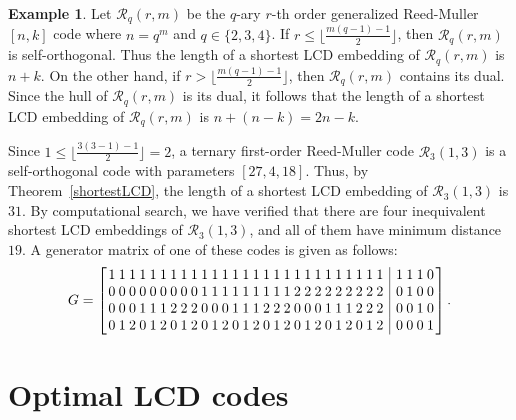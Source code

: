 \documentclass{article}
\theoremstyle{definition}
\newtheorem{example}[definition]{Example}
\theoremstyle{remark}
\begin{document}
\begin{example}
    Let $\mathcal{R}_q(r, m)$ be the $q$-ary $r$-th order generalized Reed-Muller $[n, k]$ code where $n=q^m$ and $q\in\{2, 3, 4\}$. If $r\le\lfloor\frac{m(q-1)-1}{2}\rfloor$, then $\mathcal{R}_q(r, m)$ is self-orthogonal. Thus the length of a shortest LCD embedding of $\mathcal{R}_q(r, m)$ is $n+k$. On the other hand, if $r>\lfloor\frac{m(q-1)-1}{2}\rfloor$, then $\mathcal{R}_q(r, m)$ contains its dual. Since the hull of $\mathcal{R}_q(r, m)$ is its dual, it follows that the length of a shortest LCD embedding of $\mathcal{R}_q(r, m)$ is $n+(n-k)=2n-k$.

    Since $1\le \lfloor\frac{3(3-1)-1}{2}\rfloor=2$, a ternary first-order Reed-Muller code $\mathcal{R}_3(1, 3)$ is a self-orthogonal code with parameters $[27, 4, 18]$. Thus, by Theorem~\ref{shortestLCD}, the length of a shortest LCD embedding of $\mathcal{R}_3(1, 3)$ is $31$. By computational search, we have verified that there are four inequivalent shortest LCD embeddings of $\mathcal{R}_3(1, 3)$, and all of them have minimum distance $19$. A generator matrix of one of these codes is given as follows:
    \[
    \setlength{\arraycolsep}{1.2pt}
    G=\left[
    \begin{array}{ccccccccccccccccccccccccccc|cccc}
    1 & 1 & 1 & 1 & 1 & 1 & 1 & 1 & 1 & 1 & 1 & 1 & 1 & 1 & 1 & 1 & 1 & 1 & 1 & 1 & 1 & 1 & 1 & 1 & 1 & 1 & 1 ~&~ 1 & 1 & 1 & 0 \\
    0 & 0 & 0 & 0 & 0 & 0 & 0 & 0 & 0 & 1 & 1 & 1 & 1 & 1 & 1 & 1 & 1 & 1 & 2 & 2 & 2 & 2 & 2 & 2 & 2 & 2 & 2 ~&~ 0 & 1 & 0 & 0 \\
    0 & 0 & 0 & 1 & 1 & 1 & 2 & 2 & 2 & 0 & 0 & 0 & 1 & 1 & 1 & 2 & 2 & 2 & 0 & 0 & 0 & 1 & 1 & 1 & 2 & 2 & 2 ~&~ 0 & 0 & 1 & 0 \\
    0 & 1 & 2 & 0 & 1 & 2 & 0 & 1 & 2 & 0 & 1 & 2 & 0 & 1 & 2 & 0 & 1 & 2 & 0 & 1 & 2 & 0 & 1 & 2 & 0 & 1 & 2 ~&~ 0 & 0 & 0 & 1
    \end{array}
    \right].
    \]
\end{example}


\section{Optimal LCD codes}
\end{document}
